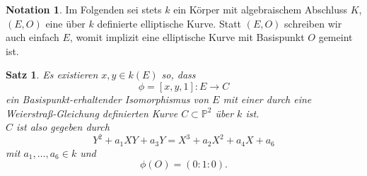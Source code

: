 \documentclass{amsart}
\theoremstyle{plain}
\newtheorem{proposition}[subsection]{Satz}
\theoremstyle{definition}
\newtheorem*{notation}{Notation}
\newcommand{\projspace}{\mathds{P}}
\begin{document}
\begin{notation}
	Im Folgenden sei stets $k$ ein Körper mit algebraischem Abschluss $K$, $(E, O)$ eine über $k$ definierte elliptische Kurve. 
	Statt $(E, O)$ schreiben wir auch einfach $E$, womit implizit eine elliptische Kurve mit Basispunkt $O$ gemeint ist.
\end{notation}

\begin{proposition}
	\label{prop-existenz-weierstrass-koordinaten}
	Es existieren $x, y \in k(E)$ so, dass
	\begin{equation*}
		\phi = [x, y, 1] : E \rightarrow C
	\end{equation*}
	ein Basispunkt-erhaltender Isomorphismus von $E$ mit einer durch eine Weierstraß-Gleichung definierten Kurve $C \subset \projspace^2$ über $k$ ist. \\
	$C$ ist also gegeben durch
	\begin{equation*}
		Y^2 + a_1 XY + a_3 Y = X^3 + a_2 X^2 + a_4 X + a_6
	\end{equation*}
	mit $a_1, \dots, a_6 \in k$ und
	\begin{equation*}
		\phi(O) = (0 : 1 : 0).
	\end{equation*}
\end{proposition}
\end{document}
